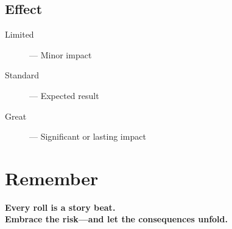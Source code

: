 \subsection*{Effect}
\begin{description}
  \item[Limited] — Minor impact
  \item[Standard] — Expected result
  \item[Great] — Significant or lasting impact
\end{description}

\section{Remember}

\begin{center}
\textbf{Every roll is a story beat.} \\
\textbf{Embrace the risk—and let the consequences unfold.}
\end{center}
